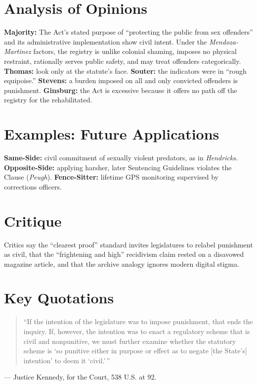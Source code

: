 \documentclass[12pt]{article}
\begin{document}
\section{Analysis of Opinions}
\textbf{Majority:} The Act's stated purpose of ``protecting the public from sex offenders'' and its administrative implementation show civil intent. Under the \textit{Mendoza-Martinez} factors, the registry is unlike colonial shaming, imposes no physical restraint, rationally serves public safety, and may treat offenders categorically. \textbf{Thomas:} look only at the statute's face. \textbf{Souter:} the indicators were in ``rough equipoise.'' \textbf{Stevens:} a burden imposed on all and only convicted offenders is punishment. \textbf{Ginsburg:} the Act is excessive because it offers no path off the registry for the rehabilitated.

\section{Examples: Future Applications}
\textbf{Same-Side:} civil commitment of sexually violent predators, as in \textit{Hendricks}. \textbf{Opposite-Side:} applying harsher, later Sentencing Guidelines violates the Clause (\textit{Peugh}). \textbf{Fence-Sitter:} lifetime GPS monitoring supervised by corrections officers.

\section{Critique}
Critics say the ``clearest proof'' standard invites legislatures to relabel punishment as civil, that the ``frightening and high'' recidivism claim rested on a disavowed magazine article, and that the archive analogy ignores modern digital stigma.

\section{Key Quotations}
\begin{quote}
``If the intention of the legislature was to impose punishment, that ends the inquiry. If, however, the intention was to enact a regulatory scheme that is civil and nonpunitive, we must further examine whether the statutory scheme is `so punitive either in purpose or effect as to negate [the State's] intention' to deem it `civil.'\,''
\end{quote}
\noindent --- Justice Kennedy, for the Court, 538 U.S. at 92.
\end{document}
